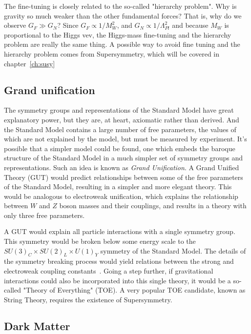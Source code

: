The fine-tuning is closely related to the so-called "hierarchy problem".
Why is gravity so much weaker than the other fundamental forces?
That is, why do we observe $G_F \gg G_N$?
Since $G_F \propto 1/{M_W^2}$, and $G_N \propto 1/\Lambda_{Pl}^2$ and because $M_W$ is proportional to the Higgs vev, the Higgs-mass fine-tuning and the hierarchy problem are really the same thing.
A possible way to avoid fine tuning and the hierarchy problem comes from Supersymmetry, which will be covered in chapter~\ref{ch:susy}

\subsection{Grand unification}\label{subsec:sm_unification}

The symmetry groups and representations of the Standard Model have great explanatory power, but they are, at heart, axiomatic rather than derived.
And the Standard Model contains a large number of free parameters, the values of which are not explained by the model, but must be measured by experiment.
It's possible that a simpler model could be found, one which embeds the baroque structure of the Standard Model in a much simpler set of symmetry groups and representations.
Such an idea is known as \textit{Grand Unification}.
A Grand Unified Theory (GUT) would predict relationships between some of the free parameters of the Standard Model, resulting in a simpler and more elegant theory.
This would be analogous to electroweak unification, which explains the relationship between $W$ and $Z$ boson masses and their couplings, and results in a theory with only three free parameters.

A GUT would explain all particle interactions with a single symmetry group.
This symmetry would be broken below some energy scale to the $SU(3)_C \times SU(2)_L \times U(1)_Y$ symmetry of the Standard Model.
The details of the symmetry breaking process would yield relations between the strong and electroweak coupling constants~\cite{sm-gut}.
Going a step further, if gravitational interactions could also be incorporated into this single theory, it would be a so-called "Theory of Everything" (TOE).
A very popular TOE candidate, known as String Theory, requires the existence of Supersymmetry.

\subsection{Dark Matter}\label{subsec:sm_dark_matter}


